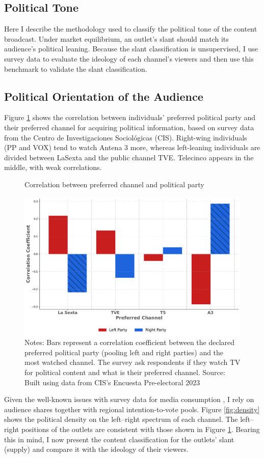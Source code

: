 \documentclass[12pt]{article}
\begin{document}
	
	\subsection{Political Tone}
	
	\label{sec:classification}
	
	Here I describe the methodology used to classify the political tone of the content broadcast. Under market equilibrium, an outlet's slant should match its audience's political leaning. Because the slant classification is unsupervised, I use survey data to evaluate the ideology of each channel's viewers and then use this benchmark to validate the slant classification.
	
	\subsection*{Political Orientation of the Audience}
	
	Figure \ref{fig:opinion} shows the correlation between individuals' preferred political party and their preferred channel for acquiring political information, based on survey data from the Centro de Investigaciones Sociológicas (CIS). Right-wing individuals (PP and VOX) tend to watch Antena 3 more, whereas left-leaning individuals are divided between LaSexta and the public channel TVE. Telecinco appears in the middle, with weak correlations.
	
	
	\begin{figure}[h!]
		\centering
		\caption{Correlation between preferred channel and political party}
		\includegraphics[width=120mm]{figures/corr_party_channel3}
		\caption*{\small Notes:  Bars represent a correlation coefficient between the declared preferred political party (pooling left and right parties) and the most watched channel. The survey ask respondents if they watch TV for political content and what is their preferred channel. Source: Built using data from CIS's Encuesta Pre-electoral 2023 }
		\label{fig:opinion}
	\end{figure}
	Given the well-known issues with survey data for media consumption \citep{prior}, I rely on audience shares together with regional intention-to-vote pools. Figure \ref{fig:density} shows the political density on the left–right spectrum of each channel. The left–right positions of the outlets are consistent with those shown in Figure \ref{fig:opinion}. Bearing this in mind, I now present the content classification for the outlets’ slant (supply) and compare it with the ideology of their viewers.
	
\end{document}
